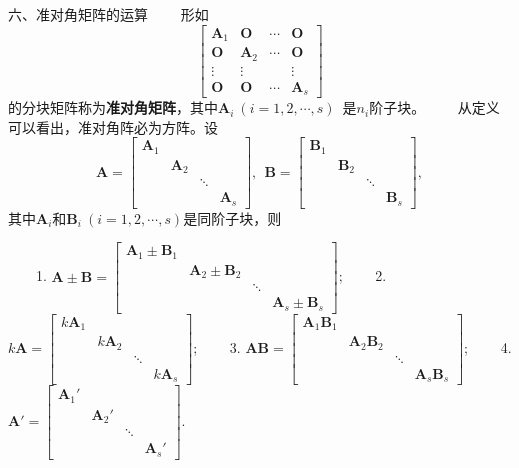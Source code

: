 \documentclass[compress,mathserif,cjk]{beamer}
\theoremstyle{remark}
\numberwithin{equation}{section}
\newcommand{\hei}{\bf}      %
\begin{document}
\begin{CJK}{UTF8}{gbsn}
\begin{frame}{六、准对角矩阵的运算}
 \ \ \ \ 形如
 $$\left[\begin{matrix}\bm A_1&\bm O&\cdots& \bm O\\\bm O&\bm A_2&\cdots& \bm O\\ \vdots&\vdots&&\vdots\\
 \bm O&\bm O&\cdots& \bm A_s\end{matrix}\right]$$
 的分块矩阵称为{\hei 准对角矩阵}，其中$\bm A_i~(i=1,2,\cdots,s)$~是$n_i$阶子块。
 \pause\vskip 5pt
 \ \ \ \ 从定义可以看出，准对角阵必为方阵。设
 $$\bm A=\left[\begin{matrix}\bm A_1&&& \\&\bm A_2&& \\ &&\ddots&\\&&& \bm A_s\end{matrix}\right],~~
 \bm B=\left[\begin{matrix}\bm B_1&&& \\&\bm B_2&& \\ &&\ddots&\\&&& \bm B_s\end{matrix}\right],$$
 其中$\bm A_i$和$\bm B_i~(i=1,2,\cdots,s)$是同阶子块，则
\end{frame}

\begin{frame}\small
 \ \ \ \ 1. $\bm A\pm\bm B=\left[\begin{matrix}\bm A_1\pm\bm B_1&&& \\&\bm A_2\pm\bm B_2&& \\ &&\ddots&\\&&& \bm A_s\pm\bm B_s\end{matrix}\right]$;
 \vskip 5pt
 \ \ \ \ 2. $k\bm A=\left[\begin{matrix}k\bm A_1&&& \\&k\bm A_2&& \\ &&\ddots&\\&&&k\bm A_s\end{matrix}\right]$;
 \vskip 5pt
 \ \ \ \ 3. $\bm A\bm B=\left[\begin{matrix}\bm A_1\bm B_1&&& \\&\bm A_2\bm B_2&& \\ &&\ddots&\\&&& \bm A_s\bm B_s\end{matrix}\right]$;
 \vskip 5pt
 \ \ \ \ 4. $\bm A'=\left[\begin{matrix}\bm A_1'&&& \\&\bm A_2'&& \\ &&\ddots&\\&&&\bm A_s'\end{matrix}\right]$.


\end{frame}
\end{CJK}
\end{document}
